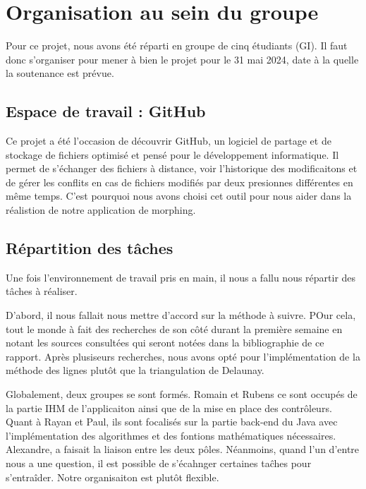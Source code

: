 \section{Organisation au sein du groupe}

Pour ce projet, nous avons été réparti en groupe de cinq étudiants (GI). Il faut donc s'organiser pour mener à bien le projet pour le 31 mai 2024, date à la quelle la soutenance est prévue.


\subsection{Espace de travail : GitHub}

Ce projet a été l'occasion de découvrir GitHub, un logiciel de partage et de stockage de fichiers optimisé et pensé pour le développement informatique. Il permet de s'échanger des fichiers à distance, voir l'historique des modificaitons et de gérer les conflits en cas de fichiers modifiés par deux presionnes différentes en même temps. C'est pourquoi nous avons choisi cet outil pour nous aider dans la réalistion de notre application de morphing.


\subsection{Répartition des tâches}

Une fois l'environnement de travail pris en main, il nous a fallu nous répartir des tâches à réaliser.

D'abord, il nous fallait nous mettre d'accord sur la méthode à suivre. POur cela, tout le monde à fait des recherches de son côté durant la première semaine en notant les sources consultées qui seront notées dans la bibliographie de ce rapport. Après plusiseurs recherches, nous avons opté pour l'implémentation de la méthode des lignes plutôt que la triangulation de Delaunay.

Globalement, deux groupes se sont formés. Romain et Rubens ce sont occupés de la partie IHM de l'applicaiton ainsi que de la mise en place des contrôleurs. Quant à Rayan et Paul, ils sont focalisés sur la partie back-end du Java avec l'implémentation des algorithmes et des fontions mathématiques nécessaires. Alexandre, a faisait la liaison entre les deux pôles. Néanmoins, quand l'un d'entre nous a une question, il est possible de s'écahnger certaines taĉhes pour s'entraîder. Notre organisaiton est plutôt flexible.



